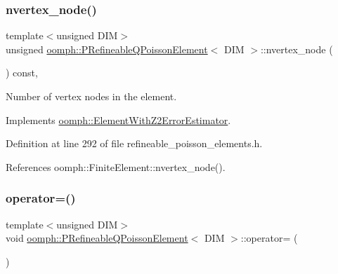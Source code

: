 \subsubsection{\texorpdfstring{nvertex\+\_\+node()}{nvertex\_node()}}
{\footnotesize\ttfamily template$<$unsigned D\+IM$>$ \\
unsigned \hyperlink{classoomph_1_1PRefineableQPoissonElement}{oomph\+::\+P\+Refineable\+Q\+Poisson\+Element}$<$ D\+IM $>$\+::nvertex\+\_\+node (\begin{DoxyParamCaption}{ }\end{DoxyParamCaption}) const\hspace{0.3cm}{\ttfamily [inline]}, {\ttfamily [virtual]}}



Number of vertex nodes in the element. 



Implements \hyperlink{classoomph_1_1ElementWithZ2ErrorEstimator_a19495a0e77ef4ff35f15fdf7913b4077}{oomph\+::\+Element\+With\+Z2\+Error\+Estimator}.



Definition at line 292 of file refineable\+\_\+poisson\+\_\+elements.\+h.



References oomph\+::\+Finite\+Element\+::nvertex\+\_\+node().

\mbox{\label{classoomph_1_1PRefineableQPoissonElement_a4576bfc2714913a2aa58c85308b99097}} 
\subsubsection{\texorpdfstring{operator=()}{operator=()}}
{\footnotesize\ttfamily template$<$unsigned D\+IM$>$ \\
void \hyperlink{classoomph_1_1PRefineableQPoissonElement}{oomph\+::\+P\+Refineable\+Q\+Poisson\+Element}$<$ D\+IM $>$\+::operator= (\begin{DoxyParamCaption}\item[{const \hyperlink{classoomph_1_1PRefineableQPoissonElement}{P\+Refineable\+Q\+Poisson\+Element}$<$ D\+IM $>$ \&}]{ }\end{DoxyParamCaption})\hspace{0.3cm}{\ttfamily [inline]}}



